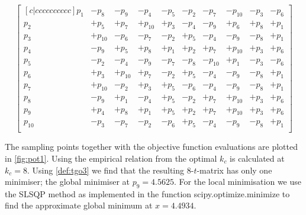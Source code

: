 \begin{equation}
\begin{bmatrix}[c|cccccccccc]
     p_{1}  &  -p_{8}  &  -p_{9}  &  -p_{4}  &  -p_{5}  &  -p_{2}  &  -p_{7}  &  -p_{10}   & -p_{3}  &  -p_{6} \\
     p_{2}  &  +p_{5}  &  +p_{7}  &  +p_{10}  &  +p_{3}  &  -p_{4}  &  -p_{9}  &  +p_{6}   & +p_{8}  &  +p_{1} \\
     p_{3}  &  +p_{10}  &  -p_{6}  &  -p_{7}  &  -p_{2}  &  +p_{5}  &  -p_{4}  &  -p_{9}   & -p_{8}  &  +p_{1} \\
     p_{4}  &  -p_{9}  &  +p_{5}  &  +p_{8}  &  +p_{1}  &  +p_{2}  &  +p_{7}  &  +p_{10}   & +p_{3}  &  +p_{6} \\
     p_{5}  &  -p_{2}  &  -p_{4}  &  -p_{9}  &  -p_{7}  &  -p_{8}  &  -p_{10}  &  +p_{1}   & -p_{3}  &  -p_{6} \\
     p_{6}  &  +p_{3}  &  +p_{10}  &  +p_{7}  &  -p_{2}  &  +p_{5}  &  -p_{4}  &  -p_{9}   & -p_{8}  &  +p_{1} \\
     p_{7}  &  +p_{10}  &  -p_{2}  &  +p_{3}  &  +p_{5}  &  -p_{6}  &  -p_{4}  &  -p_{9}   & -p_{8}  &  +p_{1} \\
     p_{8}  &  -p_{9}  &  +p_{1}  &  -p_{4}  &  +p_{5}  &  -p_{2}  &  +p_{7}  &  +p_{10}   & +p_{3}  &  +p_{6} \\
     p_{9}  &  +p_{4}  &  +p_{8}  &  +p_{1}  &  +p_{5}  &  +p_{2}  &  +p_{7}  &  +p_{10}   & +p_{3}  &  +p_{6} \\
    p_{10}  &  -p_{3}  &  -p_{7}  &  -p_{2}  &  -p_{6}  &  +p_{5}  &  -p_{4}  &  -p_{9}    &-p_{8}  &  +p_{1} \\
\end{bmatrix}
\end{equation}

The sampling points together with the objective function evaluations are plotted in \autoref{fig:pot1}. Using the empirical relation from \citet{Henderson2015} the optimal $k_c$ is calculated at $k_c = 8$. Using \autoref{def:tgo3} we find that the resulting $8$-$t$-matrix has only one minimiser; the global minimiser at $p_{9} = 4.5625$. For the local minimisation we use the SLSQP method as implemented in the function scipy.optimize.minimize \cite{scipy} to find the approximate global minimum at $x = 4.4934$. 

